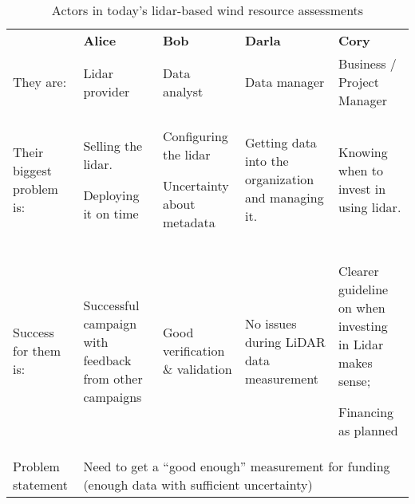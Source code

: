 \begin{table*}[!h]
 \centering
 \caption{Actors in today's lidar-based wind resource assessments}
 \begin{tabular}{@{}|p{}|p{}|p{}|p{}|p{}|@{}}
 \rowcolor{Task32Blue2} & \textbf{Alice} & \textbf{Bob} & \textbf{Darla} & \textbf{Cory} \\
They are: & 
    Lidar provider & 
    Data analyst & 
    Data manager & 
    Business / Project Manager \\
Their biggest problem is: & 
    Selling the lidar. 

    Deploying it on time &
    Configuring the lidar

    Uncertainty about metadata &
    Getting data into the organization and managing it. & 
    Knowing when to invest in using lidar. \\
Success for them is: & 
    Successful campaign with feedback from other campaigns &
    Good verification \& validation & 
    No issues during LiDAR data measurement &
    Clearer guideline on when investing in Lidar makes sense;

    Financing as planned \\
Problem statement & 
    \multicolumn{4}{p{0.74\textwidth+6\tabcolsep+3\arrayrulewidth}}{Need to get a ``good enough'' measurement for funding (enough data with sufficient uncertainty)} \\
\end{tabular}
\label{tab:01_wra_now}
\end{table*}


